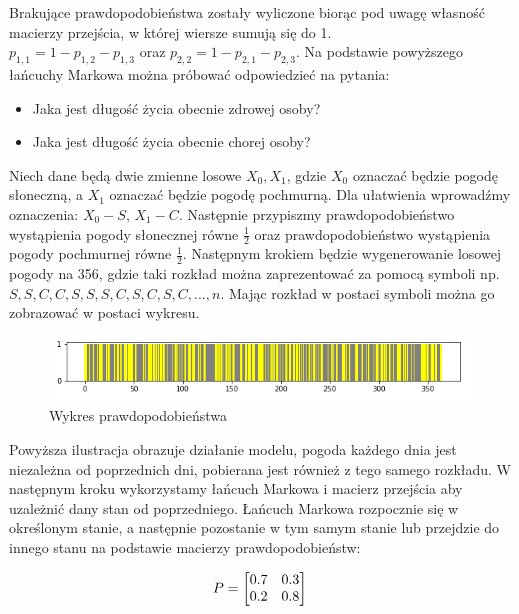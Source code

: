 \begin{przyklad}
Brakujące prawdopodobieństwa zostały wyliczone biorąc pod uwagę własność macierzy przejścia, w której wiersze sumują się do 1. \\
$p_{1,1} = 1 - p_{1,2} - p_{1,3}$ oraz $p_{2,2} = 1 - p_{2,1} - p_{2,3}$. Na podstawie powyższego łańcuchy Markowa można próbować odpowiedzieć na pytania:

\begin{itemize}
	\item Jaka jest długość życia obecnie zdrowej osoby?
	\item Jaka jest długość życia obecnie chorej osoby?
\end{itemize}

\end{przyklad}


\begin{przyklad}
 
	Niech dane będą dwie zmienne losowe $X_{0}, X_{1}$, gdzie $X_{0}$ oznaczać będzie pogodę słoneczną, a $X_{1}$ oznaczać będzie pogodę pochmurną. Dla ułatwienia wprowadźmy oznaczenia: $X_{0} - S$, $X_{1} - C$. Następnie przypiszmy prawdopodobieństwo wystąpienia pogody słonecznej równe $\frac{1}{2}$ oraz prawdopodobieństwo wystąpienia pogody pochmurnej równe $\frac{1}{2}$. Następnym krokiem będzie wygenerowanie losowej pogody na 356, gdzie taki rozkład można zaprezentować za pomocą symboli np. $S,S,C,C,S,S,S,C,S,C,S,C, ..., n$. Mając rozkład w postaci symboli można go zobrazować w postaci wykresu.
 
	
	\begin{figure}[H]
		\centering
		\includegraphics[width=0.7\linewidth]{wykres_pogoda}
		\caption[ ]{Wykres prawdopodobieństwa}
		\label{fig:wykrespogoda}
	\end{figure}
	Powyższa ilustracja obrazuje działanie modelu, pogoda każdego dnia jest niezależna od poprzednich dni, pobierana jest również z tego samego rozkładu. W następnym kroku wykorzystamy łańcuch Markowa i macierz przejścia aby uzależnić dany stan od poprzedniego. Łańcuch Markowa rozpocznie się w określonym stanie, a następnie pozostanie w tym samym stanie lub przejdzie do innego stanu na podstawie macierzy prawdopodobieństw:
	
	\[
	P = 
	\begin{bmatrix}
	0.7 & 0.3 \\
	0.2 & 0.8 
	\end{bmatrix}\\
	\]
	

\end{przyklad}
